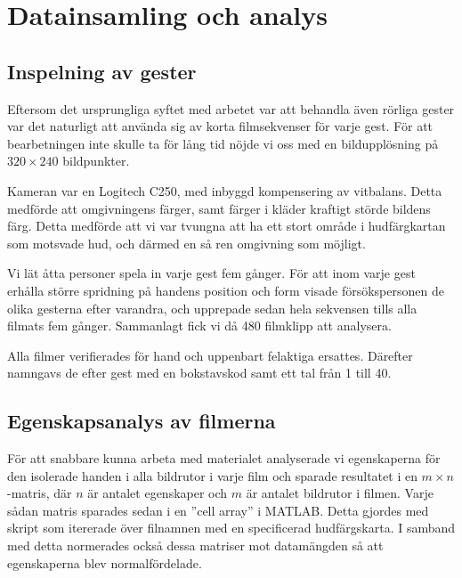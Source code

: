 \documentclass[../rapport_MVEX01-11-05]{subfiles}
\begin{document}
\section{Datainsamling och analys}

\subsection{Inspelning av gester}
Eftersom det ursprungliga syftet med arbetet var att behandla även rörliga
gester var det naturligt att använda sig av korta filmsekvenser för varje gest.
För att bearbetningen inte skulle ta för lång tid nöjde vi oss med en
bildupplösning på $320\times240$ bildpunkter.

Kameran var en Logitech C250, med inbyggd kompensering av vitbalans. Detta
medförde att omgivningens färger, samt färger i kläder kraftigt störde bildens 
färg. Detta medförde att vi var tvungna att ha ett stort område i hudfärgkartan
som motsvade hud, och därmed en så ren omgivning som möjligt.

Vi lät åtta personer spela in varje gest fem gånger.
För att inom varje gest erhålla större spridning på handens position och form
visade försökspersonen de olika gesterna efter varandra, och upprepade sedan
hela sekvensen tills alla filmats fem gånger. Sammanlagt fick vi då 480
filmklipp att analysera.

Alla filmer verifierades för hand och uppenbart felaktiga ersattes. Därefter
namngavs de efter gest med en bokstavskod samt ett tal från 1 till 40.

\subsection{Egenskapsanalys av filmerna}
För att snabbare kunna arbeta med materialet analyserade vi
egenskaperna för den isolerade handen i alla bildrutor i varje film och sparade
resultatet i en $m\times n$-matris, där $n$ är antalet egenskaper och $m$ är
antalet bildrutor i filmen. Varje sådan matris sparades sedan i en ''cell array''
i MATLAB. Detta gjordes med skript som itererade över filnamnen
med en specificerad hudfärgskarta. I samband med detta normerades också dessa
matriser mot datamängden så att egenskaperna blev normalfördelade.
\end{document}
